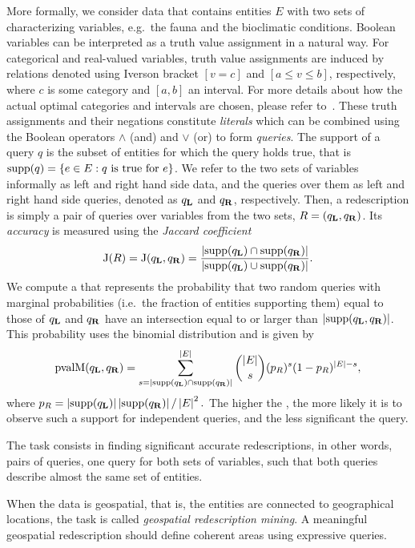 More formally, we consider data that contains entities $E$ with two sets
of characterizing variables, e.g.\ the fauna and the bioclimatic
conditions. 
Boolean variables can be interpreted as a truth value
assignment in a natural way.  For categorical and real-valued
variables, truth value assignments are induced by relations denoted using Iverson bracket $[v=c]$
and $[a \leq v \leq b]$, respectively, where $c$ is some category and
$[a, b]$ an interval. For more details about how the actual optimal categories and intervals are chosen, please refer to~\cite{galbrun12black}.  These truth assignments and their negations
constitute \emph{literals} which can be combined using the Boolean
operators $\land$ (and) and $\lor$ (or) to form \emph{queries}.
The support of a query $q$ is the subset of entities for which
the query holds true, that is 
$\operatorname*{supp}(q) = \{e\in E : q\text{ is true for } e\}$.
We refer to the two sets of variables informally as left and right
hand side data, and the queries over them as left and
right hand side queries, denoted as  $q_{\mathbf{L}}$ and  $q_{\mathbf{R}}$, respectively.
Then, a redescription is simply a pair of queries over variables from the
two sets, $R=(q_{\mathbf{L}},q_{\mathbf{R}})$.    
Its \emph{accuracy} is 
measured using the \emph{Jaccard coefficient} 
\[
\jacc(R)= \jacc(q_\iLHS,q_\iRHS) = \frac{\abs{\supp(q_\iLHS) \cap \supp(q_\iRHS)}}%
{\abs{\supp(q_\iLHS)\cup\supp(q_\iRHS)}}.
\]
We compute a \pValue{} that represents the probability that two random
queries with marginal probabilities (i.e.\ the fraction of entities
supporting them) equal to those of $q_{\mathbf{L}}$ and $q_{\mathbf{R}}$ have an
intersection equal to or larger than $\abs{\supp(q_\iLHS,
  q_\iRHS)}$. This probability uses the binomial distribution and is given by \[
\text{pvalM}(q_\iLHS, q_\iRHS) = \sum_{s=\abs{\supp(q_\iLHS) \cap \supp(q_\iRHS)}}^{\abs{E}} {\abs{E} \choose s} (p_R)^s (1- p_R)^{\abs{E} - s},\]
where $p_R = \abs{\supp(q_\iLHS)}\abs{\supp(q_\iRHS)}/\abs{E}^2.$
The higher the \pValue, the more likely it is to observe such a
support for independent queries, and the less significant the query.

The task consists in finding significant accurate redescriptions, in other words, pairs of
queries, one query for both sets of variables, such that both queries
describe almost the same set of entities.

When the data is geospatial, that is, the entities are connected to
geographical locations, the task is called \emph{geospatial redescription mining}.
 A meaningful geospatial redescription should define
coherent areas using expressive queries.

